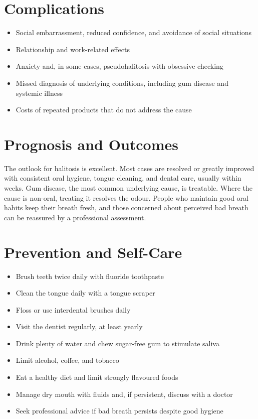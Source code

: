 \section*{Complications}
\begin{itemize}
    \item Social embarrassment, reduced confidence, and avoidance of social situations
    \item Relationship and work-related effects
    \item Anxiety and, in some cases, pseudohalitosis with obsessive checking
    \item Missed diagnosis of underlying conditions, including gum disease and systemic illness
    \item Costs of repeated products that do not address the cause
\end{itemize}

\section*{Prognosis and Outcomes}
The outlook for halitosis is excellent. Most cases are resolved or greatly improved with consistent oral hygiene, tongue cleaning, and dental care, usually within weeks. Gum disease, the most common underlying cause, is treatable. Where the cause is non-oral, treating it resolves the odour. People who maintain good oral habits keep their breath fresh, and those concerned about perceived bad breath can be reassured by a professional assessment.

\section*{Prevention and Self-Care}
\begin{itemize}
    \item Brush teeth twice daily with fluoride toothpaste
    \item Clean the tongue daily with a tongue scraper
    \item Floss or use interdental brushes daily
    \item Visit the dentist regularly, at least yearly
    \item Drink plenty of water and chew sugar-free gum to stimulate saliva
    \item Limit alcohol, coffee, and tobacco
    \item Eat a healthy diet and limit strongly flavoured foods
    \item Manage dry mouth with fluids and, if persistent, discuss with a doctor
    \item Seek professional advice if bad breath persists despite good hygiene
\end{itemize}

